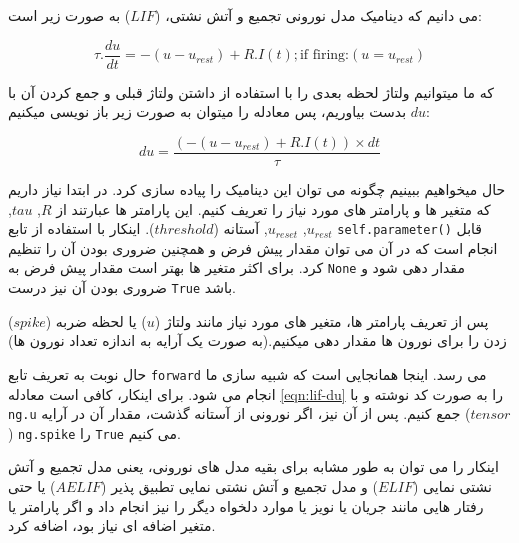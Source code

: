 \documentclass{article}
\begin{document}
            می دانیم که دینامیک مدل نورونی تجمیع و آتش نشتی، 
            ($LIF$) 
            به صورت زیر است:
            \begin{latin}
                \begin{equation}
                    \tau.\frac{du}{dt}=-(u-u_{rest}) + R.I(t); \text{if firing:} (u=u_{rest})
                \end{equation}
            \end{latin}
            که ما میتوانیم ولتاژ لحظه بعدی را با استفاده از داشتن ولتاژ قبلی و جمع کردن آن با 
            $du$ 
            بدست بیاوریم، پس معادله را میتوان به صورت زیر باز نویسی میکنیم:
            \begin{latin}
                \begin{equation}\label{eqn:lif-du}
                    du=\frac{(-(u-u_{rest}) + R.I(t))\times dt}{\tau}
                \end{equation}
            \end{latin}
            حال میخواهیم ببینیم چگونه می توان این دینامیک را پیاده سازی کرد. در ابتدا نیاز داریم که متغیر ها و پارامتر های مورد نیاز را تعریف کنیم. این پارامتر ها عبارتند از 
            $R$,
            $tau$,
            $u_{rest}$,
            $u_{reset}$,
            آستانه
            ($threshold$).
            اینکار با استفاده از تابع 
            \texttt{self.parameter()} 
            قابل انجام است که در آن می توان مقدار پیش فرض و همچنین ضروری بودن آن را تنظیم کرد. برای اکثر متغیر ها بهتر است مقدار پیش فرض به 
            \texttt{None} 
            مقدار دهی شود و ضروری بودن آن نیز درست
            \texttt{True} 
            باشد.

            پس از تعریف پارامتر ها، متغیر های مورد نیاز مانند ولتاژ
            ($u$)
            یا لحظه ضربه
            ($spike$)
            زدن
            را برای نورون ها مقدار دهی میکنیم.(به صورت یک آرایه به اندازه تعداد نورون ها)

            حال نوبت به تعریف تابع 
            \texttt{forward} 
            می رسد. اینجا همانجایی است که شبیه سازی ما انجام می شود.
            برای اینکار، کافی است معادله
            \ref{eqn:lif-du}
            را به صورت کد نوشته و با 
            \texttt{ng.u} 
            جمع کنیم. پس از آن نیز، اگر نورونی از آستانه گذشت، مقدار آن در آرایه
            ($tensor$) 
            \texttt{ng.spike} 
            را 
            \texttt{True} 
            می کنیم.

            اینکار را می توان به طور مشابه برای بقیه مدل های نورونی، یعنی مدل تجمیع و آتش نشتی نمایی
            ($ELIF$) 
            و مدل تجمیع و آتش نشتی نمایی تطبیق پذیر
            ($AELIF$) 
            یا حتی رفتار هایی مانند جریان یا نویز یا موارد دلخواه دیگر را نیز انجام داد و اگر پارامتر یا متغیر اضافه ای نیاز بود، اضافه کرد.
    
\end{document}
